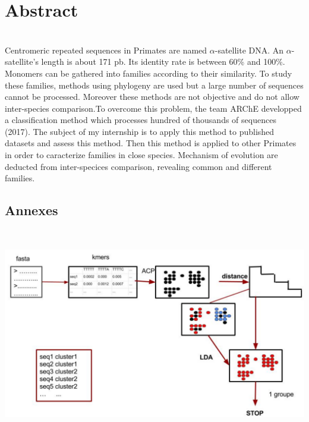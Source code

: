 \documentclass[12pt,a4paper]{article}
\begin{document}
\section*{Abstract}~\\[0.2cm]
Centromeric repeated sequences in Primates are named $\alpha$-satellite DNA. An $\alpha$-satellite's length is about 171 pb. Its identity rate is between 60\% and 100\%. Monomers can be gathered into families according to their similarity. To study these families, methods using phylogeny are used but a large number of sequences cannot be processed. Moreover these methods are not objective and do not allow inter-species comparison.To overcome this problem, the team ARChE developped a classification method which processes hundred of thousands of sequences (2017). The subject of my internship is to apply this method to published datasets and assess this method. Then this method is applied to other Primates in order to caracterize families in close species. Mechanism of evolution are deducted from inter-specices comparison, revealing common and different families. 

\newpage
\thispagestyle{empty}
\begin{appendix}
\section*{Annexes}~\\[0.2cm]
    \begin{center}
        \includegraphics[scale=0.35, angle=0]{img/algo_classification.png}
        \label{a_micro}
    \end{center}
\end{appendix}
\end{document}

